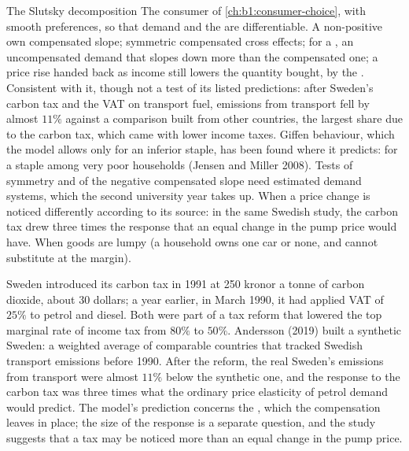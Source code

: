 \begin{model}{The Slutsky decomposition}
\assumes The consumer of \cref{ch:b1:consumer-choice}, with smooth
preferences, so that demand and the  are
differentiable.
\predicts A non-positive own compensated slope; symmetric compensated cross
effects; for a , an uncompensated demand that slopes down more
than the compensated one; a price rise handed back as income still lowers
the quantity bought, by the .
\tested Consistent with it, though not a test of its listed predictions:
after Sweden's carbon tax and the VAT on transport fuel, emissions from
transport fell by almost $11\%$ against a comparison built from other
countries, the largest share due to the carbon tax, which came with lower
income taxes. %
Giffen behaviour, which the model allows only for an inferior staple, has
been found where it predicts: for a staple among very poor households
(Jensen and Miller 2008). %
Tests of symmetry and of the negative compensated slope need estimated
demand systems, which the second university year takes up.
\breaks When a price change is noticed differently according to its
source: in the same Swedish study, the carbon tax drew three times the
response that an equal change in the pump price would
have. %
When goods are lumpy (a household owns one car or none, and cannot
substitute at the margin).
\end{model}

\begin{record}
Sweden introduced its carbon tax in 1991 at 250 kronor a tonne of carbon
dioxide, about 30 dollars; a year earlier, in March 1990, it had applied
VAT of $25\%$ to petrol and diesel. %
Both were part of a tax reform that lowered the top marginal rate of
income tax from $80\%$ to $50\%$. %
Andersson (2019) built a synthetic Sweden: a weighted average of comparable
countries that tracked Swedish transport emissions before 1990. After the
reform, the real Sweden's emissions from transport were almost $11\%$ below
the synthetic one, and the response to the carbon tax was three times
what the ordinary price elasticity of petrol demand would
predict. %
The model's prediction concerns the , which the
compensation leaves in place; the size of the response is a separate
question, and the study suggests that a tax may be noticed more than an
equal change in the pump price.
\end{record}

